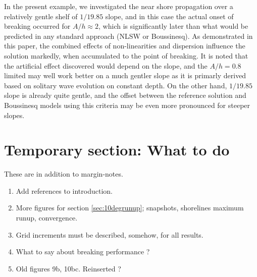 \documentclass[review]{elsarticle}
\newcommand{\BoussClaw}{\textsc{BoussClaw} }
\begin{document}
In the present example, we investigated the near shore propagation over a relatively gentle shelf of $1/19.85$ slope,
and in this case the actual onset of breaking occurred for $A/h \approx 2$, which is significantly later
than what would be predicted in any standard approach (NLSW or Boussinesq). As demonstrated in this paper,
the combined effects of non-linearities and dispersion influence the solution markedly, when accumulated to the point
of breaking. It is noted that the artificial effect discovered would depend on the slope, 
and the $A/h=0.8$ limited may well work better on a much gentler slope as it is primarly derived based on 
solitary wave evolution on constant depth. On the other hand, $1/19.85$ slope is already quite gentle,
and the offset between the reference solution and Boussinesq models using this criteria may
be even more pronounced for steeper slopes.


\section*{Temporary section: What to do}
These are in addition to margin-notes.
\begin{enumerate}
\item Add references to introduction.
\item More figures for section \ref{sec:10degrunup}; snapshots, shorelines 
maximum runup, convergence.
\item Grid increments must be described, somehow, for all results.
\item What to say about breaking performance ?
\item Old figures 9b, 10bc. Reinserted ?
\end{enumerate}
\end{document}

